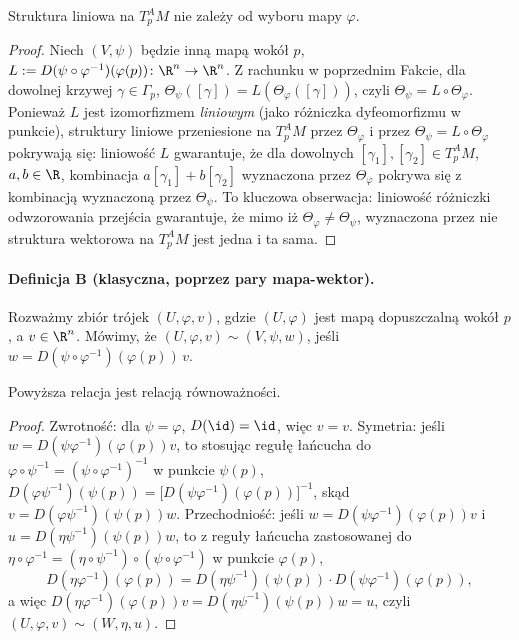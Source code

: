 \begin{fakt}
Struktura liniowa na $T_p^AM$ nie zależy od wyboru mapy $\varphi$.
\end{fakt}
\begin{proof}
Niech $(V,\psi)$ będzie inną mapą wokół $p$, $L:=D(\psi\circ\varphi^{-1})(\varphi(p))
\colon\R^n\to\R^n$. Z rachunku w poprzednim Fakcie, dla dowolnej krzywej $\gamma\in\Gamma_p$,
$\Theta_\psi([\gamma])=L(\Theta_\varphi([\gamma]))$, czyli $\Theta_\psi=L\circ\Theta_\varphi$.
Ponieważ $L$ jest izomorfizmem \emph{liniowym} (jako różniczka dyfeomorfizmu w punkcie),
struktury liniowe przeniesione na $T_p^AM$ przez $\Theta_\varphi$ i przez $\Theta_\psi=
L\circ\Theta_\varphi$ pokrywają się: liniowość $L$ gwarantuje, że dla dowolnych $[\gamma_1],
[\gamma_2]\in T_p^AM$, $a,b\in\R$, kombinacja $a[\gamma_1]+b[\gamma_2]$ wyznaczona przez
$\Theta_\varphi$ pokrywa się z kombinacją wyznaczoną przez $\Theta_\psi$. To kluczowa
obserwacja: liniowość różniczki odwzorowania przejścia gwarantuje, że mimo iż
$\Theta_\varphi\neq\Theta_\psi$, wyznaczona przez nie struktura wektorowa na $T_p^AM$ jest
jedna i ta sama.
\end{proof}

\paragraph*{Definicja B (klasyczna, poprzez pary mapa-wektor).} Rozważmy zbiór trójek
$(U,\varphi,v)$, gdzie $(U,\varphi)$ jest mapą dopuszczalną wokół $p$, a $v\in\R^n$.
Mówimy, że $(U,\varphi,v)\sim(V,\psi,w)$, jeśli $w=D(\psi\circ\varphi^{-1})(\varphi(p))\,v$.

\begin{fakt}
Powyższa relacja jest relacją równoważności.
\end{fakt}
\begin{proof}
Zwrotność: dla $\psi=\varphi$, $D(\id)=\id$, więc $v=v$. Symetria: jeśli $w=D(\psi\varphi^{-1})
(\varphi(p))v$, to stosując regułę łańcucha do $\varphi\circ\psi^{-1}=(\psi\circ
\varphi^{-1})^{-1}$ w punkcie $\psi(p)$, $D(\varphi\psi^{-1})(\psi(p))=\big[D(\psi\varphi^{-1})
(\varphi(p))\big]^{-1}$, skąd $v=D(\varphi\psi^{-1})(\psi(p))w$. Przechodniość: jeśli
$w=D(\psi\varphi^{-1})(\varphi(p))v$ i $u=D(\eta\psi^{-1})(\psi(p))w$, to z reguły łańcucha
zastosowanej do $\eta\circ\varphi^{-1}=(\eta\circ\psi^{-1})\circ(\psi\circ\varphi^{-1})$ w
punkcie $\varphi(p)$,
\[
D(\eta\varphi^{-1})(\varphi(p))=D(\eta\psi^{-1})(\psi(p))\cdot D(\psi\varphi^{-1})(\varphi(p)),
\]
a więc $D(\eta\varphi^{-1})(\varphi(p))v=D(\eta\psi^{-1})(\psi(p))w=u$, czyli
$(U,\varphi,v)\sim(W,\eta,u)$.
\end{proof}

